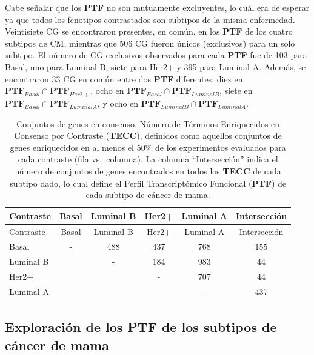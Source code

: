 \documentclass[12pt,twoside]{reedthesis}
\begin{document}
Cabe señalar que los \textbf{PTF} no son mutuamente excluyentes, lo cuál era de esperar ya que todos los fenotipos contrastados son subtipos de la misma enfermedad. Veintisiete CG se encontraron presentes, en común, en los \textbf{PTF} de los cuatro subtipos de CM, mientras que 506 CG fueron únicos (exclusivos) para un solo subtipo. El número de CG exclusivos observados para cada \textbf{PTF} fue de 103 para Basal, uno para Luminal B, siete para Her2+ y 395 para Luminal A. Además, se encontraron 33 CG en común entre dos \textbf{PTF} diferentes: diez en \(\boldsymbol{PTF}_{Basal} \cap \boldsymbol{PTF}_{Her2+}\), ocho en \(\boldsymbol{PTF}_{Basal} \cap \boldsymbol{PTF}_{Luminal B}\), siete en \(\boldsymbol{PTF}_{Basal} \cap \boldsymbol{PTF}_{Luminal A}\), y ocho en \(\boldsymbol{PTF}_{Luminal B} \cap \boldsymbol{PTF}_{Luminal A}\).
\begin{longtable}[]{@{}lccccc@{}}
\caption{Conjuntos de genes en consenso. Número de Términos Enriquecidos en Consenso por Contraste (\textbf{TECC}), definidos como aquellos conjuntos de genes enriquecidos en al menos el 50\% de los experimentos evaluados para cada contraste (fila vs.~columna). La columna ``Intersección'' indica el número de conjuntos de genes encontrados en todos los \textbf{TECC} de cada subtipo dado, lo cual define el Perfil Transcriptómico Funcional (\textbf{PTF}) de cada subtipo de cáncer de mama.\label{tab:migsa1}}\tabularnewline
\toprule
Contraste & Basal & Luminal B & Her2+ & Luminal A & Intersección\tabularnewline
\midrule
\endfirsthead
\toprule
Contraste & Basal & Luminal B & Her2+ & Luminal A & Intersección\tabularnewline
\midrule
\endhead
Basal & - & 488 & 437 & 768 & 155\tabularnewline
Luminal B & & - & 184 & 983 & 44\tabularnewline
Her2+ & & & - & 707 & 44\tabularnewline
Luminal A & & & & - & 437\tabularnewline
\bottomrule
\end{longtable}
\hypertarget{exploraciuxf3n-de-los-ptf-de-los-subtipos-de-cuxe1ncer-de-mama}{%
\subsection{Exploración de los PTF de los subtipos de cáncer de mama}\label{exploraciuxf3n-de-los-ptf-de-los-subtipos-de-cuxe1ncer-de-mama}}

\par
\end{document}
